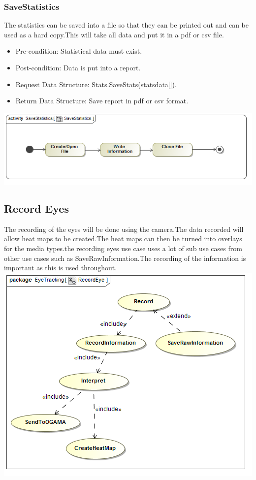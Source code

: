 		\subsubsection{SaveStatistics}
The statistics can be saved into a file so that they can be printed out and can be used as a hard copy.This will take all data and put it in a pdf or csv file.
\begin{itemize}
\item Pre-condition: Statistical data must exist.
\item Post-condition: Data is put into a report.
\item Request Data Structure: Stats.SaveStats(statsdata[]).
\item Return Data Structure: Save report in pdf or csv format.
\end{itemize}

\includegraphics[scale=0.5]{Diagrams/Activity_Diagram__SaveStatistics__SaveStatistics.png}
	
	
\subsection{Record Eyes}
The recording of the eyes will be done using the camera.The data recorded will allow heat maps to be created.The heat maps can then be turned into overlays for the media types.the recording eyes use case uses a lot of sub use cases from other use cases such as SaveRawInformation.The recording of the information is important as this is used throughout.
\newline 
	\includegraphics[scale=0.5]{Diagrams/Use_Case_Diagram__RecordEye.png}
	

